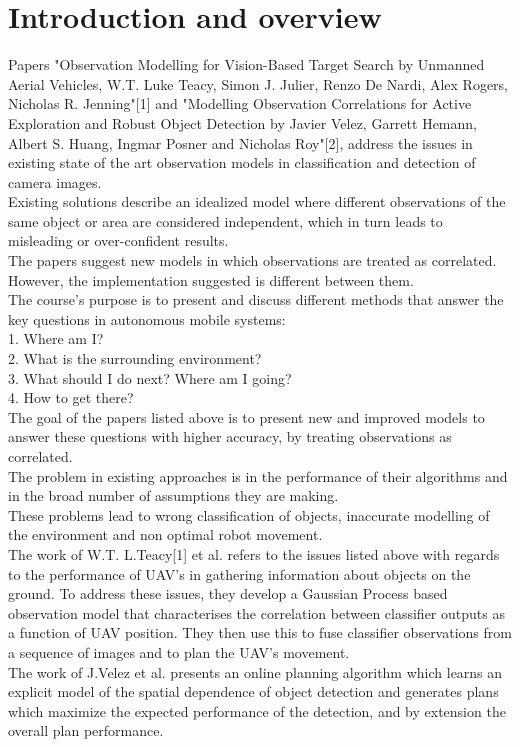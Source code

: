 \documentclass{article}
\begin{document}
	\section{Introduction and overview}
	Papers "Observation Modelling for Vision-Based Target Search by Unmanned Aerial Vehicles, W.T. Luke Teacy, Simon J. Julier, Renzo De Nardi, Alex Rogers, Nicholas R. Jenning"[1] and "Modelling Observation Correlations for Active Exploration and Robust Object Detection by Javier Velez, Garrett Hemann, Albert S. Huang, Ingmar Posner and Nicholas Roy"[2], address the issues in existing state of the art observation models in classification and detection of camera images. \\
	
	Existing solutions describe an idealized model where different observations of the same object or area are considered independent, which in turn leads to misleading or over-confident results. \\
	The papers suggest new models in which observations are treated as correlated. However, the implementation suggested is different between them. \\
	
	The course's purpose is to present and discuss different methods that answer the key questions in autonomous mobile systems: \\
	1. Where am I? \\
	2. What is the surrounding environment?\\
	3. What should I do next? Where am I going?\\
	4. How to get there?\\
	The goal of the papers listed above is to present new and improved models to answer these questions with higher accuracy, by treating observations as correlated. \\
	
	The problem in existing approaches is in the performance of their algorithms and in the broad number of assumptions they are making. \\
	These problems lead to wrong classification of objects, inaccurate modelling of the environment and non optimal robot movement. \\
	The work of W.T. L.Teacy[1] et al. refers to the issues listed above with regards to the performance of UAV's in gathering information about objects on the ground. To address these issues, they develop a Gaussian Process based observation model that characterises the correlation between classifier outputs as a function of UAV position. They then use this to fuse classifier observations from a sequence of images and to plan the UAV's movement. \\
	The work of J.Velez et al. presents an online planning algorithm which learns an explicit model of the spatial dependence of object detection and generates plans which maximize the expected performance of the detection, and by extension the overall plan performance. %
\end{document}
